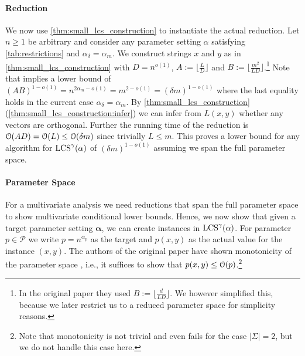 \paragraph*{Reduction}
We now use \autoref{thm:small_lcs_construction} to instantiate the actual reduction. %
Let $n \geq 1$ be arbitrary and consider any parameter setting $\alpha$ satisfying \autoref{tab:restrictions} and $\alpha_\delta = \alpha_m$.
We construct strings $x$ and $y$ as in \autoref{thm:small_lcs_construction} with $D = n^{o(1)}$, $A := \lfloor \frac{L}{D} \rfloor$ and $B := \lfloor \frac{m^2}{LD} \rfloor$.\footnote{In the original paper they used $B := \lfloor \frac{d}{LD} \rfloor$. We however simplified this, because we later restrict us to a reduced parameter space for simplicity reasons.}
Note that \uovh{} implies a lower bound of $(AB)^{1-o(1)} = n^{2\alpha_m - o(1)} = m^{2 - o(1)} = (\delta m)^{1-o(1)}$ where the last equality holds in the current case $\alpha_\delta = \alpha_m$.
By \autoref{thm:small_lcs_construction} (\ref{thm:small_lcs_construction:infer}) we can infer from $L(x,y)$ whether any vectors are orthogonal.
Further the running time of the reduction is $\mathcal{O}(AD) = \mathcal{O}(L) \leq \mathcal{O}(\delta m)$ since trivially $L \leq m$.
This proves a lower bound for any algorithm for $\text{LCS}^\gamma(\mathbb{\alpha})$ of $(\delta m)^{1-o(1)}$ assuming we span the full parameter space.



\paragraph*{Parameter Space}
For a multivariate analysis we need reductions that span the full parameter space to show multivariate conditional lower bounds.
Hence, we now show that given a target parameter setting $\mathbf{\alpha}$, we can create instances in $\text{LCS}^\gamma(\mathbf{\alpha})$.
For parameter $p \in \mathcal{P}$ we write $p = n^{\alpha_p}$ as the target and $p(x,y)$ as the actual value for the \lcs{} instance $(x,y)$.
%
The authors of the original paper have shown monotonicity of the parameter space \cite[section 4.2]{Bringman.2018}, i.e., it suffices to show that $p(x,y) \leq \mathcal{O}(p)$.\footnote{Note that monotonicity is not trivial and even fails for the case $|\Sigma| = 2$, but we do not handle this case here.}


